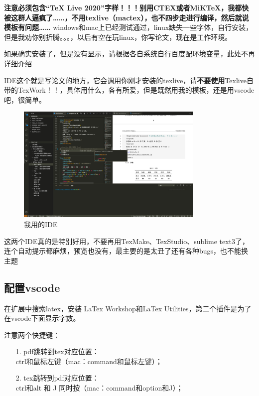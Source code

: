 \documentclass[AutoFakeBold]{template/LZUThesis2021_master}
\begin{document}
\textbf{注意必须包含“TeX Live 2020”字样！！！别用CTEX或者MiKTeX，我都快被这群人逼疯了……，不用texlive（mactex），也不四步走进行编译，然后就说模板有问题……}
windows和mac上已经测试通过，linux缺失一些字体，自行安装，但是我劝你别折腾。。。，以后有空在玩linux，你写论文，现在是工作环境。


如果确实安装了，但是没有显示，请根据各自系统自行百度配环境变量，此处不再详细介绍


IDE这个就是写论文的地方，它会调用你刚才安装的texlive，请\textbf{不要使用}Texlive自带的TexWork！！，具体用什么，各有所爱，但是既然用我的模板，还是用vscode吧，很简单。


\begin{figure}[H]
	\centering
    \includegraphics[width=0.8\textwidth]{figures/vscode.png}
    \caption{我用的IDE}
    \label{fig_ide}
\end{figure}

这两个IDE真的是特别好用，不要再用TexMake、TexStudio、sublime text3了，连个自动提示都麻烦，预览也没有，最主要的是太丑了还有各种bugs，也不能换主题


\subsection{配置vscode}
在扩展中搜索latex，安装 LaTex Workshop和LaTex Utilities，第二个插件是为了在vscode下面显示字数。

注意两个快捷键：
\begin{itemize}
	\item[1. ] pdf跳转到tex对应位置：\\ctrl和鼠标左键（mac：command和鼠标左键）；
	\item[2. ] tex跳转到pdf对应位置：\\ctrl和alt 和 J 同时按（mac：command和option和J）；
\end{itemize}
\end{document}
